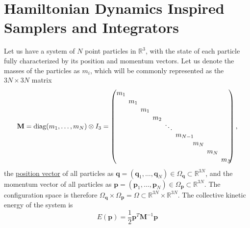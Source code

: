 \section{Hamiltonian Dynamics Inspired Samplers and Integrators}

    Let us have a system of $N$ point particles in $\mathbb{R}^3$, with the state of each particle fully characterized by its position and momentum vectors. Let us denote the masses of the particles as $m_i$, which will be commonly represented as the $3N \times 3N$ matrix  
    \begin{equation}
      \mathbf{M} = \mathrm{diag}(m_1, \ldots, m_N) \otimes I_3 = \begin{pmatrix}
      m_1\hspace{-2mm}& & & & & & & & \\ 
      & m_1\hspace{-2mm}& & & & & & & \\ 
      & & m_1\hspace{-2mm}& & & & & & \\ 
      & & & m_2 \hspace{-2mm}& & & & & \\[-1mm] 
      & & & & \ddots \hspace{-2mm} & & & & \\[-1mm] 
      & & & & & m_{N-1}\hspace{-4mm} & & & \\ 
      & & & & & & m_N \hspace{-2mm}& & \\ 
      & & & & & & & m_N\hspace{-2mm} & \\ 
      & & & & & & & & m_N\hspace{-2mm} \end{pmatrix},
    \end{equation}
    the \hyperref[alg-def:position-vector]{position vector} of all particles as $\mathbf{q} = (\mathbf{q}_1, \ldots, \mathbf{q}_N) \in \Omega_\mathbf{q} \subset \mathbb{R}^{3N}$, and the momentum vector of all particles as $\mathbf{p} = (\mathbf{p}_1, \ldots, \mathbf{p}_N) \in \Omega_\mathbf{p} \subset \mathbb{R}^{3N}$. The configuration space is therefore $\Omega_\mathbf{q} \times \Omega_\mathbf{p} = \Omega \subset \mathbb{R}^{3N} \times \mathbb{R}^{3N}$. The collective kinetic energy of the system is 
    \begin{equation}
      E (\mathbf{p}) = \frac{1}{2} \mathbf{p}^T \mathbf{M}^{-1} \mathbf{p}
    \end{equation}
